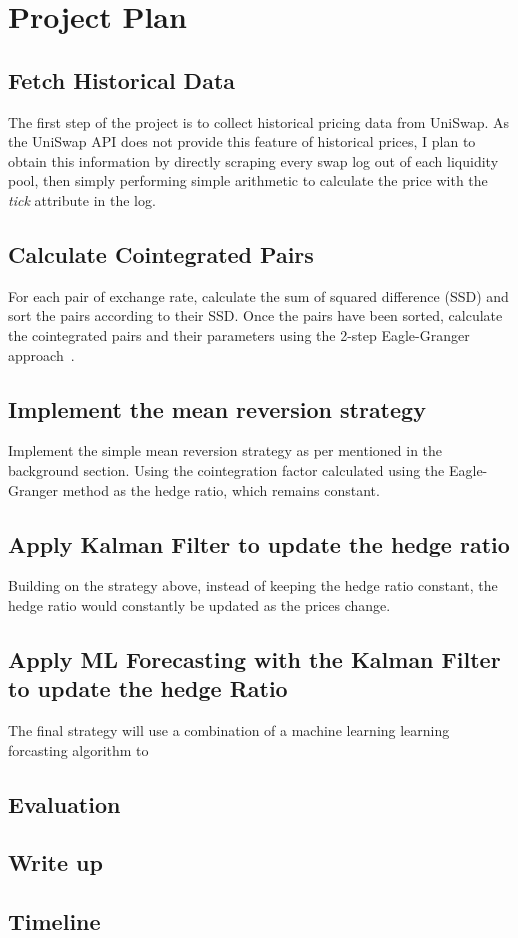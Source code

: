 \chapter{Project Plan}

\section{Fetch Historical Data}
The first step of the project is to collect historical pricing data from UniSwap. As the UniSwap API does not provide this feature of historical prices, I plan to obtain this information by directly scraping every swap log out of each liquidity pool, then simply performing simple arithmetic to calculate the price with the \textit{tick} attribute in the log.

\section{Calculate Cointegrated Pairs}
For each pair of exchange rate, calculate the sum of squared difference (SSD) and sort the pairs according to their SSD. Once the pairs have been sorted, calculate the cointegrated pairs and their parameters using the 2-step Eagle-Granger approach~\cite{doi:10.1080/14697688.2016.1164337}.

\section{Implement the mean reversion strategy}
Implement the simple mean reversion strategy as per mentioned in the background section. Using the cointegration factor calculated using the Eagle-Granger method as the hedge ratio, which remains constant.

\section{Apply Kalman Filter to update the hedge ratio}
Building on the strategy above, instead of keeping the hedge ratio constant, the hedge ratio would constantly be updated as the prices change.

\section{Apply ML Forecasting with the Kalman Filter to update the hedge Ratio}
The final strategy will use a combination of a machine learning learning forcasting algorithm to 

\section{Evaluation}
\section{Write up}
\section{Timeline}

